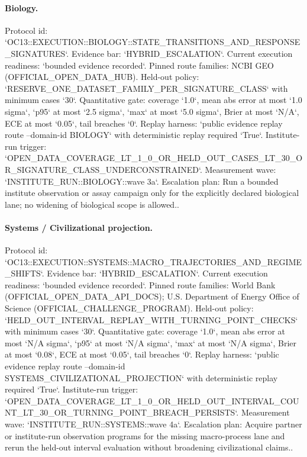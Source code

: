 \paragraph{Biology.}
Protocol id: `OC13::EXECUTION::BIOLOGY::STATE\_TRANSITIONS\_AND\_RESPONSE\_SIGNATURES`. Evidence bar: `HYBRID\_ESCALATION`. Current execution readiness: `bounded evidence recorded`.
Pinned route families: NCBI GEO (OFFICIAL\_OPEN\_DATA\_HUB).
Held-out policy: `RESERVE\_ONE\_DATASET\_FAMILY\_PER\_SIGNATURE\_CLASS` with minimum cases `30`.
Quantitative gate: coverage `1.0`, mean abs error at most `1.0 sigma`, `p95` at most `2.5 sigma`, `max` at most `5.0 sigma`, Brier at most `N/A`, ECE at most `0.05`, tail breaches `0`.
Replay harness: `public evidence replay route --domain-id BIOLOGY` with deterministic replay required `True`.
Institute-run trigger: `OPEN\_DATA\_COVERAGE\_LT\_1\_0\_OR\_HELD\_OUT\_CASES\_LT\_30\_OR\_SIGNATURE\_CLASS\_UNDERCONSTRAINED`. Measurement wave: `INSTITUTE\_RUN::BIOLOGY::wave 3a`.
Escalation plan: Run a bounded institute observation or assay campaign only for the explicitly declared biological lane; no widening of biological scope is allowed..

\paragraph{Systems / Civilizational projection.}
Protocol id: `OC13::EXECUTION::SYSTEMS::MACRO\_TRAJECTORIES\_AND\_REGIME\_SHIFTS`. Evidence bar: `HYBRID\_ESCALATION`. Current execution readiness: `bounded evidence recorded`.
Pinned route families: World Bank (OFFICIAL\_OPEN\_DATA\_API\_DOCS); U.S. Department of Energy Office of Science (OFFICIAL\_CHALLENGE\_PROGRAM).
Held-out policy: `HELD\_OUT\_INTERVAL\_REPLAY\_WITH\_TURNING\_POINT\_CHECKS` with minimum cases `30`.
Quantitative gate: coverage `1.0`, mean abs error at most `N/A sigma`, `p95` at most `N/A sigma`, `max` at most `N/A sigma`, Brier at most `0.08`, ECE at most `0.05`, tail breaches `0`.
Replay harness: `public evidence replay route --domain-id SYSTEMS\_CIVILIZATIONAL\_PROJECTION` with deterministic replay required `True`.
Institute-run trigger: `OPEN\_DATA\_COVERAGE\_LT\_1\_0\_OR\_HELD\_OUT\_INTERVAL\_COUNT\_LT\_30\_OR\_TURNING\_POINT\_BREACH\_PERSISTS`. Measurement wave: `INSTITUTE\_RUN::SYSTEMS::wave 4a`.
Escalation plan: Acquire partner or institute-run observation programs for the missing macro-process lane and rerun the held-out interval evaluation without broadening civilizational claims..
